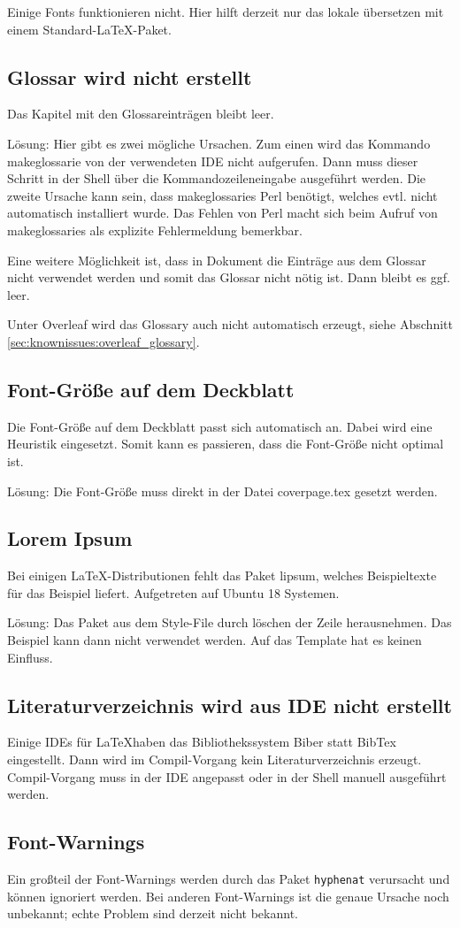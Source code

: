 Einige Fonts funktionieren nicht. Hier hilft derzeit nur das lokale übersetzen mit einem Standard-LaTeX-Paket.

\subsection{Glossar wird nicht erstellt}
Das Kapitel mit den Glossareinträgen bleibt leer.

Lösung: Hier gibt es zwei mögliche Ursachen. Zum einen wird das Kommando makeglossarie von der verwendeten IDE nicht aufgerufen. Dann muss dieser Schritt in der Shell über die Kommandozeileneingabe ausgeführt werden. Die zweite Ursache kann sein, dass makeglossaries Perl benötigt, welches evtl. nicht automatisch installiert wurde. Das Fehlen von Perl macht sich beim Aufruf von makeglossaries als explizite Fehlermeldung bemerkbar.

Eine weitere Möglichkeit ist, dass in Dokument die Einträge aus dem Glossar nicht verwendet werden und somit das Glossar nicht nötig ist. Dann bleibt es ggf. leer.

Unter Overleaf wird das Glossary auch nicht automatisch erzeugt, siehe Abschnitt \ref{sec:knownissues:overleaf_glossary}. 

\subsection{Font-Größe auf dem Deckblatt}
Die Font-Größe auf dem Deckblatt passt sich automatisch an. Dabei wird eine Heuristik eingesetzt. Somit kann es passieren, dass die Font-Größe nicht optimal ist.

Lösung: Die Font-Größe muss direkt in der Datei coverpage.tex gesetzt werden.

\subsection{Lorem Ipsum}
Bei einigen \LaTeX -Distributionen fehlt das Paket lipsum, welches Beispieltexte für das Beispiel liefert. Aufgetreten auf  Ubuntu 18 Systemen.

Lösung: Das Paket aus dem Style-File durch löschen der Zeile herausnehmen. Das Beispiel kann dann nicht verwendet werden. Auf das Template hat es keinen Einfluss.

\subsection{Literaturverzeichnis wird aus IDE nicht erstellt}
Einige IDEs für \LaTeX haben das Bibliothekssystem Biber statt BibTex eingestellt. Dann wird im Compil-Vorgang kein Literaturverzeichnis erzeugt. Compil-Vorgang muss in der IDE angepasst oder in der Shell manuell ausgeführt werden.

\subsection{Font-Warnings}
Ein großteil der Font-Warnings werden durch das Paket \texttt{hyphenat} verursacht und können ignoriert werden. Bei anderen Font-Warnings ist die genaue Ursache noch unbekannt; echte Problem sind derzeit nicht bekannt.

